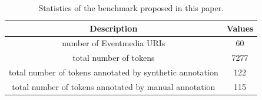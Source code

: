 \documentclass[10pt,a4paper]{article}
\begin{document}
\begin{table}[h]
\centering %
\begin{tabular}{c c } %
\hline %
Description & Values \\ [0.5ex] %
\hline\hline %
number of Eventmedia URIs & 60  \\
total number of tokens & 7277  \\
total number of tokens annotated by synthetic annotation & 122  \\
total number of tokens annotated by manual annotation & 115  \\
\hline %
\end{tabular}
\caption{Statistics of the benchmark proposed in this paper.} %
\label{tab:benchmark} %
\end{table}
\end{document}
